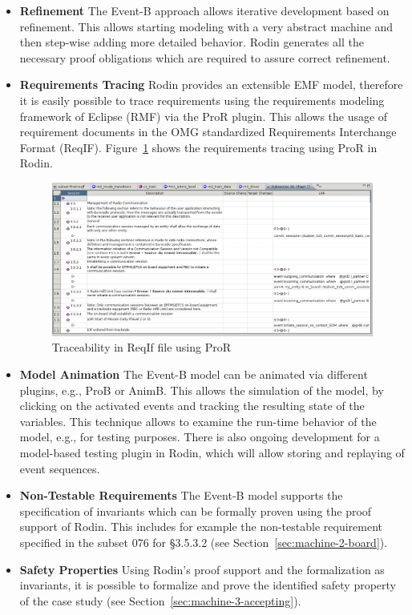 \documentclass{template/openetcs_article}
\begin{document}
\begin{itemize}
\item {\bf Refinement} The Event-B approach allows iterative development based
  on refinement. This allows starting modeling with a very abstract machine and
  then step-wise adding more detailed behavior. Rodin generates all the
  necessary proof obligations which are required to assure correct refinement.
\item {\bf Requirements Tracing} Rodin provides an extensible EMF model,
  therefore it is easily possible to trace requirements using the requirements
  modeling framework of Eclipse (RMF) via the ProR plugin. This allows the usage
  of requirement documents in the OMG standardized Requirements Interchange
  Format (ReqIF). Figure~\ref{fig:traceability-pror} shows the requirements
  tracing using ProR in Rodin.
  \begin{figure}[ht]
    \centering
    \includegraphics[width=\textwidth]{ReqIfinRodin}
    \caption{Traceability in ReqIf file using ProR}
    \label{fig:traceability-pror}
  \end{figure}
\item {\bf Model Animation} The Event-B model can be animated via different
  plugins, e.g., ProB or AnimB. This allows the simulation of the model, by
  clicking on the activated events and tracking the resulting state of the
  variables. This technique allows to examine the run-time behavior of the
  model, e.g., for testing purposes. There is also ongoing development for a
  model-based testing plugin in Rodin, which will allow storing and replaying of
  event sequences.
\item {\bf Non-Testable Requirements} The Event-B model supports the
  specification of invariants which can be formally proven using the proof
  support of Rodin. This includes for example the non-testable requirement
  specified in the subset 076 for §3.5.3.2 (see
  Section~\ref{sec:machine-2-board}).
\item {\bf Safety Properties} Using Rodin's proof support and the formalization
  as invariants, it is possible to formalize and prove the identified safety
  property of the case study (see Section~\ref{sec:machine-3-accepting}).
\end{itemize}
\end{document}
